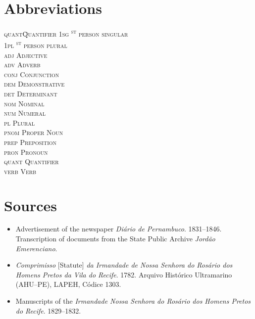 \documentclass[output=paper,colorlinks,citecolor=brown]{langscibook}
\begin{document}
\section*{Abbreviations}
\begin{multicols}{3}
  \begin{tabbing}
    \scshape quant\hspace{.33em}\= Quantifier \kill
    \scshape 1sg   \textsuperscript{st} person singular \\
    \scshape 1pl   \textsuperscript{st} person plural \\
    \scshape adj   \> Adjective \\
    \scshape adv   \> Adverb \\
    \scshape conj  \> Conjunction \\
    \scshape dem   \> Demonstrative \\
    \scshape det   \> Determinant \\
    \scshape nom   \> Nominal \\
    \scshape num   \> Numeral \\
    \scshape pl    \> Plural \\
    \scshape pnom  \> Proper Noun \\
    \scshape prep  \> Preposition \\
    \scshape pron  \> Pronoun \\
    \scshape quant \> Quantifier \\
    \scshape verb  \> Verb
  \end{tabbing}
\end{multicols}

\section*{Sources}
\begin{itemize}[wide, leftmargin=!,labelindent=0pt,itemindent=-20pt,itemsep=0pt,labelsep=0pt]
\item[] Advertisement of the newspaper \emph{Diário de Pernambuco}. 1831--1846. Transcription of documents from the State Public Archive \emph{Jordão Emerenciano}.

\item[]\emph{Comprimisso} [Statute] \emph{da Irmandade de Nossa Senhora do Rosário dos Homens Pretos da Vila do Recife}. 1782. Arquivo Histórico Ultramarino (AHU–PE), LAPEH, Códice 1303.

\item[]Manuscripts of the \emph{Irmandade Nossa Senhora do Rosário dos Homens Pretos do Recife}. 1829--1832.
\end{itemize}

\printbibliography[heading=subbibliography,notkeyword=this]
\end{document}
